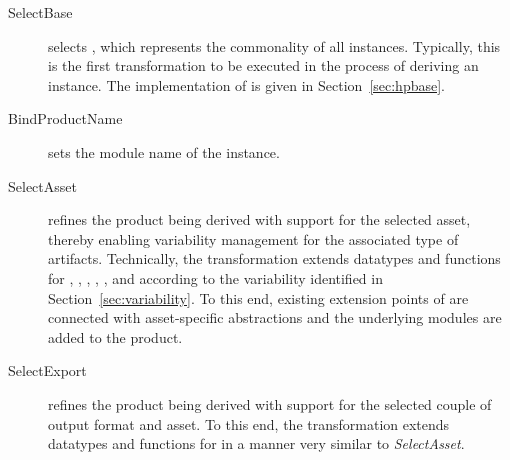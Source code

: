 \begin{description}

\item[SelectBase] selects \hpbase{}, which represents the commonality of all \hpl{} instances.
Typically, this is the first transformation to be executed in the process of deriving an instance. The implementation of \hpbase{} is given in Section~\ref{sec:hpbase}.

\item[BindProductName] sets the module name of the \hpl{} instance.

\item[SelectAsset] refines the product being derived with support for the selected asset, thereby enabling variability management for the associated type of artifacts. Technically, the transformation extends datatypes and functions for \assetr, \assetx, \asseti, \assetc, \emptyi, and \ckparser{} according to the variability identified in Section~\ref{sec:variability}. To this end, existing extension points of \hpbase{} are connected with asset-specific abstractions and the underlying modules are added to the product.

\item[SelectExport] refines the product being derived with support for the selected couple of output format and asset. To this end, the transformation extends datatypes and functions for \asseto{} in a manner very similar to \emph{SelectAsset}. 

\end{description}


